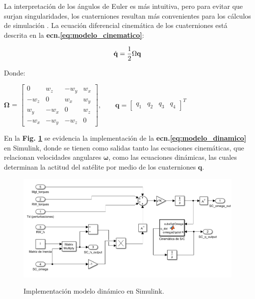  La interpretación de los ángulos de Euler es más intuitiva, pero para evitar que surjan singularidades, los cuaterniones resultan más convenientes para los cálculos de simulación \cite{Steyn2011}. La ecuación diferencial cinemática de los cuaterniones está descrita en la  \textbf{ecn.\eqref{eq:modelo_cinematico}}: 

\begin{equation}\label{eq:modelo_cinematico}
	\dot{\mathbf{q}}=\frac{1}{2} \Omega \mathbf{q} \\
\end{equation}

Donde:
 

\begin{center}
	$\boldsymbol{\Omega}$ = $\left[\begin{array}{cccc}
		0 & w_z & -w_y & w_x \\
		-w_z & 0 & w_x & w_y \\
		w_y & -w_x & 0 & w_z \\
		-w_x & -w_y & -w_z & 0
	\end{array}\right],
	\qquad
	\mathbf{q}=\left[\begin{array}{llll}
		q_1 & q_2 & q_3 & q_4
	\end{array}\right]^T
	$
\end{center}

En la \textbf{Fig. \ref{fig:din_sc}} se evidencia la implementación de la \textbf{ecn.\eqref{eq:modelo_dinamico}} en Simulink, donde se tienen como salidas tanto las ecuaciones cinemáticas, que relacionan velocidades angulares $\boldsymbol{\omega}$, como las ecuaciones dinámicas, las cuales determinan la actitud del satélite por medio de los cuaterniones $\boldsymbol{q}$.


\begin{figure}[!h]
	\begin{center}
		\includegraphics[scale=0.6]{imagenes/modelo_dinamico/dinamica_satelite.PNG}\\
	\end{center}
	\caption{Implementación modelo dinámico en Simulink.}
	\label{fig:din_sc}
	\textit{}
\end{figure}

